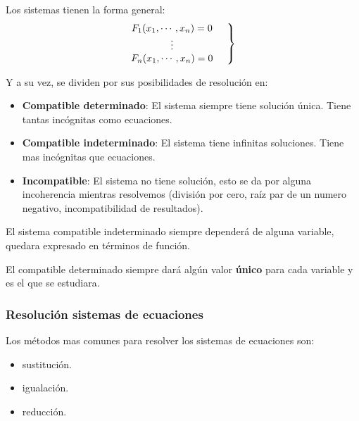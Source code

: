     Los sistemas tienen la forma general:
    \begin{equation*}
        \left.
        \begin{matrix}
            F_1(x_1,\cdots,x_n)=0\\
            \vdots\\
            F_n(x_1,\cdots,x_n)=0
        \end{matrix}
        \hspace*{0.5cm}\right\rbrace
    \end{equation*}

    Y a su vez, se dividen por sus posibilidades de resolución en:

    \begin{itemize}
        \item \textbf{Compatible determinado}: El sistema siempre tiene solución única.
            Tiene tantas incógnitas como ecuaciones.

        \item \textbf{Compatible indeterminado}: El sistema tiene infinitas soluciones.
            Tiene mas incógnitas que ecuaciones.

        \item \textbf{Incompatible}: El sistema no tiene solución, esto se da por alguna
            incoherencia mientras resolvemos (división por cero, raíz par de un numero
            negativo, incompatibilidad de resultados).
    \end{itemize}

    El sistema compatible indeterminado siempre dependerá de alguna variable,
    quedara expresado en términos de función.

    El compatible determinado siempre dará algún valor \textbf{único} para cada
    variable y es el que se estudiara.

    \subsubsection{Resolución sistemas de ecuaciones}

    Los métodos mas comunes para resolver los sistemas de ecuaciones son:

    \begin{itemize}
        \item sustitución.
        \item igualación.
        \item reducción.
    \end{itemize}

